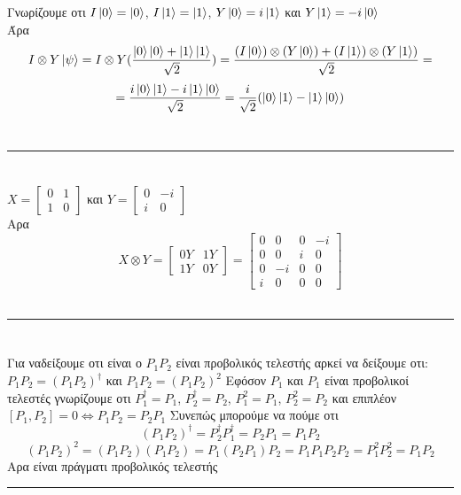 \documentclass[12pt]{article}
\begin{document}
\section*{{}}
    Γνωρίζουμε οτι $I\ket{0}= \ket{0}$, $I\ket{1}= \ket{1}$, $Y\ket{0}= i\ket{1}$ και $Y\ket{1}= -i\ket{0}$\\
Άρα 
$$ I \otimes Y\ket{\psi} = I \otimes Y(\frac{\ket{0}\ket{0} + \ket{1}\ket{1}}{\sqrt{2}}) = \frac{(I\ket{0})\otimes(Y\ket{0}) + (I\ket{1})\otimes(Y\ket{1})}{\sqrt{2}}=$$ 
$$ = \frac{i\ket{0}\ket{1} - i\ket{1}\ket{0}}{\sqrt{2}}=\frac{i}{\sqrt{2}}(\ket{0}\ket{1} -\ket{1}\ket{0})$$
\\\rule{\textwidth}{.5pt}
\section*{{}}
{\centering
$X =\begin{bmatrix}
    0 & 1 \\ 
    1 & 0
\end{bmatrix} $ και $Y =\begin{bmatrix}
    0 & -i \\ 
    i & 0
\end{bmatrix} $\\
}
Αρα
$$ X \otimes Y = \begin{bmatrix}
    0Y & 1Y \\ 
    1Y & 0Y
\end{bmatrix}=\begin{bmatrix}
    0 & 0 & 0 & -i\\ 
    0 & 0 & i & 0 \\ 
    0 & -i& 0 & 0 \\ 
    i & 0 & 0 & 0
\end{bmatrix}$$
\\\rule{\textwidth}{.5pt}
\section*{{}}
Για ναδείξουμε οτι είναι ο $P_1P_2$ είναι προβολικός τελεστής αρκεί να δείξουμε οτι:
{\centering
$P_1P_2=(P_1P_2)^\dag $ και $P_1P_2=(P_1P_2)^2 $
}
Εφόσον $P_1$ και $P_1$ είναι προβολικοί τελεστές γνωρίζουμε οτι $P_1^\dag = P_1$, $P_2^\dag = P_2$, $P_1^2 = P_1$, $P_2^2 = P_2$ και 
επιπλέον $[P_1,P_2]=0 \Leftrightarrow P_1P_2=P_2P_1$ 
Συνεπώς μπορούμε να πούμε οτι
 $$ (P_1P_2)^\dag = P_2^\dag P_1^\dag=P_2P_1=P_1P_2$$
 $$ (P_1P_2)^2 =(P_1P_2)(P_1P_2)= P_1(P_2P_1)P_2=P_1P_1P_2P_2=P_1^2P_2^2=P_1P_2$$
 Αρα είναι πράγματι προβολικός τελεστής
\\\rule{\textwidth}{.5pt}
\end{document}
